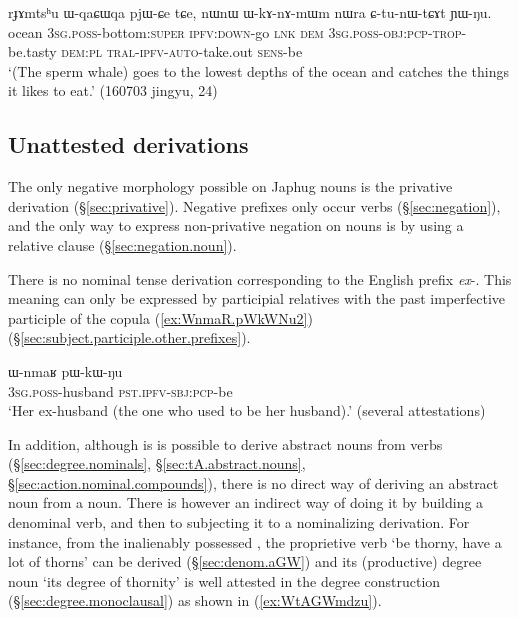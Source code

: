 \begin{exe}
\ex \label{ex:WqaCWqa}
\gll rɟɤmtsʰu ɯ-qaɕɯqa pjɯ-ɕe tɕe, nɯnɯ ɯ-kɤ-nɤ-mɯm nɯra ɕ-tu-nɯ-tɕɤt ɲɯ-ŋu. \\
ocean \textsc{3sg}.\textsc{poss}-bottom:\textsc{super} \textsc{ipfv}:\textsc{down}-go  \textsc{lnk} \textsc{dem} \textsc{3sg}.\textsc{poss}-\textsc{obj}:\textsc{pcp}-\textsc{trop}-be.tasty \textsc{dem}:\textsc{pl} \textsc{tral}-\textsc{ipfv}-\textsc{auto}-take.out \textsc{sens}-be \\
\glt `(The sperm whale) goes to the lowest depths of the ocean and catches the things it likes to eat.' (160703 jingyu, 24)
\end{exe}

\subsection{Unattested derivations} \label{sec:non.existing.derivation}

The only negative morphology possible on Japhug nouns is the privative derivation (§\ref{sec:privative}). Negative prefixes only occur verbs (§\ref{sec:negation}), and the only way to express non-privative negation on nouns is by using a relative clause  (§\ref{sec:negation.noun}).

There is no nominal tense derivation corresponding to the English prefix \textit{ex}-. This meaning can only be expressed by participial relatives with the past imperfective participle of the copula  (\ref{ex:WnmaR.pWkWNu2}) (§\ref{sec:subject.participle.other.prefixes}).

\begin{exe}
\ex \label{ex:WnmaR.pWkWNu2}
\gll  ɯ-nmaʁ pɯ-kɯ-ŋu \\
\textsc{3sg}.\textsc{poss}-husband \textsc{pst}.\textsc{ipfv}-\textsc{sbj}:\textsc{pcp}-be \\
\glt `Her ex-husband (the one who used to be her husband).' (several attestations)
 \end{exe}
 
In addition, although is is possible to derive abstract nouns from verbs (§\ref{sec:degree.nominals}, §\ref{sec:tA.abstract.nouns}, §\ref{sec:action.nominal.compounds}), there is no direct way of deriving an abstract noun from a noun. There is however an indirect way of doing it by building a denominal verb, and then to subjecting it to a nominalizing derivation. For instance, from the inalienably possessed , the proprietive verb  `be thorny, have a lot of thorns' can be derived (§\ref{sec:denom.aGW}) and its (productive) degree noun  `its degree of thornity' is well attested in the degree construction (§\ref{sec:degree.monoclausal}) as shown in (\ref{ex:WtAGWmdzu}).

